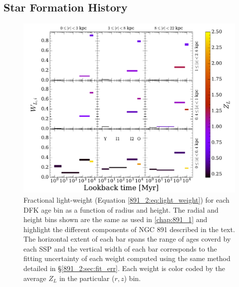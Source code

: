 
\subsection{Star Formation History}
\label{891_2:sec:SFH}
\begin{figure}
  \centering
  \includegraphics[width=\textwidth]{891_2/figs/SFH_cuts.pdf}
  \caption[SSP light weights in ($r,|z|$)
    grid]{\fixspacing\label{891_2:fig:SFH_cuts}Fractional light-weight
    (Equation \ref{891_2:eq:light_weight}) for each DFK age bin as a
    function of radius and height. The radial and height bins shown
    are the same as used in \ref{chap:891_1} and highlight the
    different components of NGC 891 described in the text. The
    horizontal extent of each bar spans the range of ages coverd by
    each SSP and the vertical width of each bar corresponds to the
    fitting uncertainty of each weight computed using the same method
    detailed in \S\ref{891_2:sec:fit_err}. Each weight is color coded
    by the average $Z_L$ in the particular ($r,z$) bin.  }

\end{figure}

